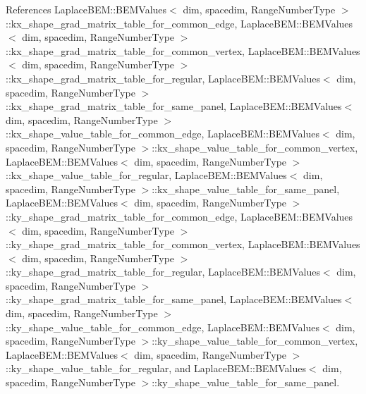 References Laplace\+B\+E\+M\+::\+B\+E\+M\+Values$<$ dim, spacedim, Range\+Number\+Type $>$\+::kx\+\_\+shape\+\_\+grad\+\_\+matrix\+\_\+table\+\_\+for\+\_\+common\+\_\+edge, Laplace\+B\+E\+M\+::\+B\+E\+M\+Values$<$ dim, spacedim, Range\+Number\+Type $>$\+::kx\+\_\+shape\+\_\+grad\+\_\+matrix\+\_\+table\+\_\+for\+\_\+common\+\_\+vertex, Laplace\+B\+E\+M\+::\+B\+E\+M\+Values$<$ dim, spacedim, Range\+Number\+Type $>$\+::kx\+\_\+shape\+\_\+grad\+\_\+matrix\+\_\+table\+\_\+for\+\_\+regular, Laplace\+B\+E\+M\+::\+B\+E\+M\+Values$<$ dim, spacedim, Range\+Number\+Type $>$\+::kx\+\_\+shape\+\_\+grad\+\_\+matrix\+\_\+table\+\_\+for\+\_\+same\+\_\+panel, Laplace\+B\+E\+M\+::\+B\+E\+M\+Values$<$ dim, spacedim, Range\+Number\+Type $>$\+::kx\+\_\+shape\+\_\+value\+\_\+table\+\_\+for\+\_\+common\+\_\+edge, Laplace\+B\+E\+M\+::\+B\+E\+M\+Values$<$ dim, spacedim, Range\+Number\+Type $>$\+::kx\+\_\+shape\+\_\+value\+\_\+table\+\_\+for\+\_\+common\+\_\+vertex, Laplace\+B\+E\+M\+::\+B\+E\+M\+Values$<$ dim, spacedim, Range\+Number\+Type $>$\+::kx\+\_\+shape\+\_\+value\+\_\+table\+\_\+for\+\_\+regular, Laplace\+B\+E\+M\+::\+B\+E\+M\+Values$<$ dim, spacedim, Range\+Number\+Type $>$\+::kx\+\_\+shape\+\_\+value\+\_\+table\+\_\+for\+\_\+same\+\_\+panel, Laplace\+B\+E\+M\+::\+B\+E\+M\+Values$<$ dim, spacedim, Range\+Number\+Type $>$\+::ky\+\_\+shape\+\_\+grad\+\_\+matrix\+\_\+table\+\_\+for\+\_\+common\+\_\+edge, Laplace\+B\+E\+M\+::\+B\+E\+M\+Values$<$ dim, spacedim, Range\+Number\+Type $>$\+::ky\+\_\+shape\+\_\+grad\+\_\+matrix\+\_\+table\+\_\+for\+\_\+common\+\_\+vertex, Laplace\+B\+E\+M\+::\+B\+E\+M\+Values$<$ dim, spacedim, Range\+Number\+Type $>$\+::ky\+\_\+shape\+\_\+grad\+\_\+matrix\+\_\+table\+\_\+for\+\_\+regular, Laplace\+B\+E\+M\+::\+B\+E\+M\+Values$<$ dim, spacedim, Range\+Number\+Type $>$\+::ky\+\_\+shape\+\_\+grad\+\_\+matrix\+\_\+table\+\_\+for\+\_\+same\+\_\+panel, Laplace\+B\+E\+M\+::\+B\+E\+M\+Values$<$ dim, spacedim, Range\+Number\+Type $>$\+::ky\+\_\+shape\+\_\+value\+\_\+table\+\_\+for\+\_\+common\+\_\+edge, Laplace\+B\+E\+M\+::\+B\+E\+M\+Values$<$ dim, spacedim, Range\+Number\+Type $>$\+::ky\+\_\+shape\+\_\+value\+\_\+table\+\_\+for\+\_\+common\+\_\+vertex, Laplace\+B\+E\+M\+::\+B\+E\+M\+Values$<$ dim, spacedim, Range\+Number\+Type $>$\+::ky\+\_\+shape\+\_\+value\+\_\+table\+\_\+for\+\_\+regular, and Laplace\+B\+E\+M\+::\+B\+E\+M\+Values$<$ dim, spacedim, Range\+Number\+Type $>$\+::ky\+\_\+shape\+\_\+value\+\_\+table\+\_\+for\+\_\+same\+\_\+panel.

\mbox{\label{classLaplaceBEM_1_1BEMValues_a7095a2e5448fa5478cc2d9affe319abf}} 
